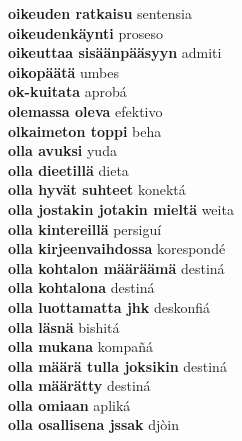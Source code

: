 \textbf{ oikeuden ratkaisu  } sentensia \\
\textbf{ oikeudenkäynti  } proseso \\
\textbf{ oikeuttaa sisäänpääsyyn  } admiti \\
\textbf{ oikopäätä  } umbes \\
\textbf{ ok-kuitata  } aprobá \\
\textbf{ olemassa oleva  } efektivo \\
\textbf{ olkaimeton toppi  } beha \\
\textbf{ olla avuksi  } yuda \\
\textbf{ olla dieetillä  } dieta \\
\textbf{ olla hyvät suhteet  } konektá \\
\textbf{ olla jostakin jotakin mieltä  } weita \\
\textbf{ olla kintereillä  } persiguí \\
\textbf{ olla kirjeenvaihdossa  } korespondé \\
\textbf{ olla kohtalon määräämä  } destiná \\
\textbf{ olla kohtalona  } destiná \\
\textbf{ olla luottamatta jhk  } deskonfiá \\
\textbf{ olla läsnä  } bishitá \\
\textbf{ olla mukana  } kompañá \\
\textbf{ olla määrä tulla joksikin  } destiná \\
\textbf{ olla määrätty  } destiná \\
\textbf{ olla omiaan  } apliká \\
\textbf{ olla osallisena jssak  } djòin \\
